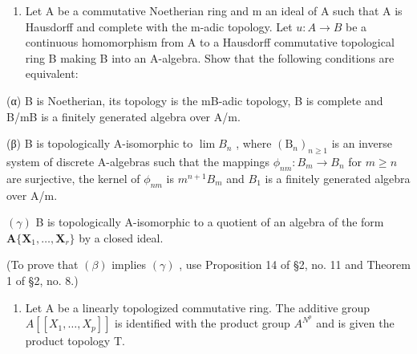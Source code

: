 \begin{enumerate}
\def\labelenumi{(\alph{enumi})}
\setcounter{enumi}{1}
\tightlist
\item
  Let A be a commutative Noetherian ring and m an ideal of A such that A is Hausdorff and complete with the m-adic topology. Let \(u: A \rightarrow B\) be a continuous homomorphism from A to a Hausdorff commutative topological ring B making B into an A-algebra. Show that the following conditions are equivalent:
\end{enumerate}

(α) B is Noetherian, its topology is the mB-adic topology, B is complete and B/mB is a finitely generated algebra over A/m.

(β) B is topologically A-isomorphic to \(\lim B_{n}\) , where \((\mathrm{B}_{n})_{n\geqslant1}\) is an inverse system of discrete A-algebras such that the mappings \(\phi_{nm}:B_{m}\to B_{n}\) for \(m\geqslant n\) are surjective, the kernel of \(\phi_{nm}\) is \(m^{n+1}B_{m}\) and \(B_{1}\) is a finitely generated algebra over A/m.

\((\gamma)\) B is topologically A-isomorphic to a quotient of an algebra of the form \(\mathbf{A}\{\mathbf{X}_1,\dots ,\mathbf{X}_r\}\) by a closed ideal.

(To prove that \((\beta)\) implies \((\gamma)\) , use Proposition 14 of §2, no. 11 and Theorem 1 of §2, no. 8.)

\begin{enumerate}
\def\labelenumi{\arabic{enumi}.}
\setcounter{enumi}{7}
\tightlist
\item
  Let A be a linearly topologized commutative ring. The additive group \(A[[X_{1},\ldots,X_{p}]]\) is identified with the product group \(A^{N^{p}}\) and is given the product topology T.
\end{enumerate}

